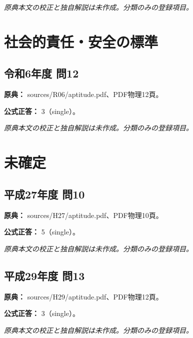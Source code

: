 \par\textit{原典本文の校正と独自解説は未作成。分類のみの登録項目。}

\section{社会的責任・安全の標準}

\subsection{令和6年度 問12}
\label{q:r06-reg-apt-12}

\noindent\textbf{原典：} sources/R06/aptitude.pdf、PDF物理12頁。

\textbf{公式正答：} 3（single）。

\par\textit{原典本文の校正と独自解説は未作成。分類のみの登録項目。}

\section{未確定}

\subsection{平成27年度 問10}
\label{q:h27-reg-apt-10}

\noindent\textbf{原典：} sources/H27/aptitude.pdf、PDF物理10頁。

\textbf{公式正答：} 5（single）。

\par\textit{原典本文の校正と独自解説は未作成。分類のみの登録項目。}

\subsection{平成29年度 問13}
\label{q:h29-reg-apt-13}

\noindent\textbf{原典：} sources/H29/aptitude.pdf、PDF物理12頁。

\textbf{公式正答：} 3（single）。

\par\textit{原典本文の校正と独自解説は未作成。分類のみの登録項目。}
